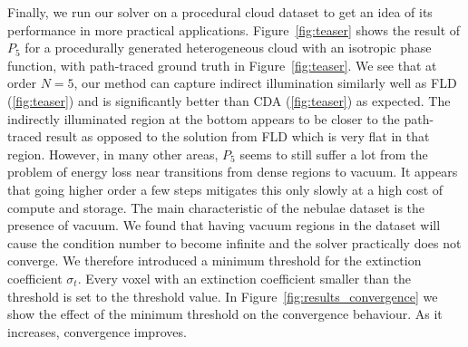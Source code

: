 \documentclass{egpubl}
\newcommand{\icaption}[1]{\caption{#1}}
\begin{document}
Finally, we run our solver on a procedural cloud dataset to get an idea of its performance in more practical applications. Figure~\ref{fig:teaser} shows the result of $P_5$ for a procedurally generated heterogeneous cloud with an isotropic phase function, with path-traced ground truth in Figure~\ref{fig:teaser}. We see that at order $N=5$, our method can capture indirect illumination similarly well as FLD (\ref{fig:teaser}) and is significantly better than CDA (\ref{fig:teaser}) as expected. The indirectly illuminated region at the bottom appears to be closer to the path-traced result as opposed to the solution from FLD which is very flat in that region. However, in many other areas, $P_5$ seems to still suffer a lot from the problem of energy loss near transitions from dense regions to vacuum. It appears that going higher order a few steps mitigates this only slowly at a high cost of compute and storage.
The main characteristic of the nebulae dataset is the presence of vacuum. We found that having vacuum regions in the dataset will cause the condition number to become infinite and the solver practically does not converge. We therefore introduced a minimum threshold for the extinction coefficient $\sigma_t$. Every voxel with an extinction coefficient smaller than the threshold is set to the threshold value. In Figure~\ref{fig:results_convergence} we show the effect of the minimum threshold on the convergence behaviour. As it increases, convergence improves.


\end{document}
